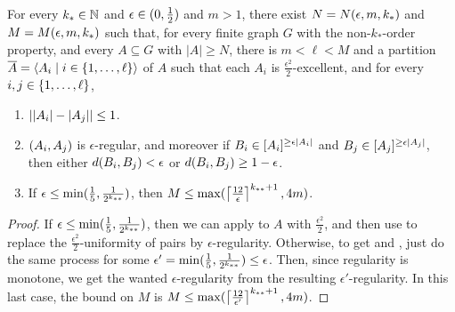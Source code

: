         \begin{theorem} \label{thm:existance_of_regular_partitions}
            For every $k_* \in \mathbb{N}$ and $\epsilon \in ( 0, \frac{1}{2} )$ and $m > 1$, there exist $N = N( \epsilon, m, k_* )$
            and $M = M( \epsilon, m, k_* )$ such that, for every finite graph $G$ with the non-$k_{*}$-order property,
            and every $A \subseteq G$ with $|A| \geq N$, there is $m < \ell < M$ and a partition
            $\overline{A} = \left< A_i \mid i \in \{ 1, \dots, \ell \} \right>$ of $A$ such that each $A_i$ is
            $\frac{\epsilon^2}{2}$-excellent, and for every $i, j \in \{ 1, \dots, \ell \}$,
            \begin{enumerate}
                \item \label{itm:existance_of_regular_partitions.1} $| | A_i |- | A_j | | \leq 1$.
                \item \label{itm:existance_of_regular_partitions.2} $( A_i, A_j )$ is $\epsilon$-regular, and moreover if
                    $B_i \in [ A_i ]^{\geq \epsilon | A_i |}$ and $B_j \in [ A_j ]^{\geq \epsilon | A_j |}$,
                    then either $d( B_i, B_j ) < \epsilon$ or $d( B_i, B_j ) \geq 1 - \epsilon$.
                \item \label{itm:existance_of_regular_partitions.3} If $\epsilon \leq \min ( \frac{1}{5}, \frac{1}{2^{k_{**}}} )$, then
                    $M \leq \max ( \left\lceil \frac{12}{\epsilon} \right\rceil^{k_{**}+1}, 4m )$.
            \end{enumerate}
            \begin{proof}
                If $\epsilon \leq \min ( \frac{1}{5}, \frac{1}{2^{k_{**}}} )$, then we can apply 
                to $A$ with $\frac{\epsilon^2}{2}$, and then use  to replace the
                $\frac{\epsilon^2}{2}$-uniformity of pairs by $\epsilon$-regularity.
                Otherwise, to get  and ,
                just do the same process for some $\epsilon' = \min ( \frac{1}{5}, \frac{1}{2^{k_{**}}} ) \leq \epsilon$.
                Then, since regularity is monotone, we get the wanted $\epsilon$-regularity from the resulting $\epsilon'$-regularity.
                In this last case, the bound on $M$ is $M \leq \max ( \left\lceil \frac{12}{\epsilon'} \right\rceil^{k_{**}+1}, 4m )$.
            \end{proof}
        \end{theorem}


